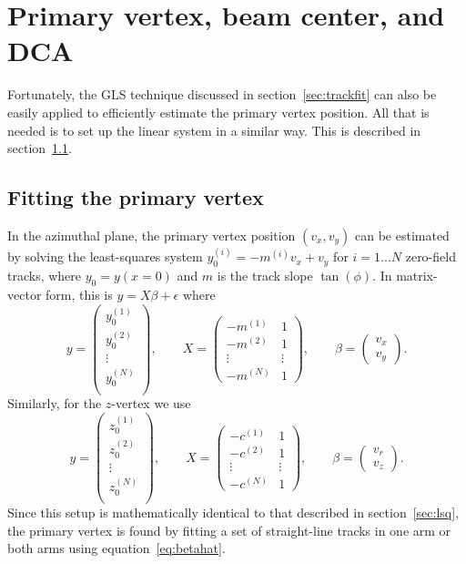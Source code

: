 \documentclass[12pt]{article}
\begin{document}
\section{Primary vertex, beam center, and DCA}
Fortunately, the GLS technique discussed in section~\ref{sec:trackfit} can also be easily applied to efficiently estimate the primary vertex position. All that is needed is to set up the linear system in a similar way. This is described in section~\ref{sec:vertex}.

\subsection{Fitting the primary vertex} \label{sec:vertex}
In the azimuthal plane, the primary vertex position $(v_x, v_y)$ can be estimated by solving the least-squares system $y_0^{(i)} = -m^{(i)}v_x + v_y$ for $i=1...N$ zero-field tracks, where $y_0 = y(x=0)$ and $m$ is the track slope $\tan(\phi)$. In matrix-vector form, this is $y = X\beta + \epsilon$ where
\begin{equation} \label{eq:vxy}
y = 
 \begin{pmatrix}
 y_0^{(1)}\\
 y_0^{(2)}\\
 \vdots \\
 y_0^{(N)}\\
 \end{pmatrix},
 \qquad
X =
 \begin{pmatrix}
  -m^{(1)}  & 1\\
  -m^{(2)}  & 1\\
  \vdots  & \vdots \\
  -m^{(N)}  & 1
 \end{pmatrix},
 \qquad
\beta = 
 \begin{pmatrix}
 v_x\\
 v_y
 \end{pmatrix}.
\end{equation}
Similarly, for the $z$-vertex we use
\begin{equation} \label{eq:vrz}
y = 
 \begin{pmatrix}
 z_0^{(1)}\\
 z_0^{(2)}\\
 \vdots \\
 z_0^{(N)}\\
 \end{pmatrix},
 \qquad
X =
 \begin{pmatrix}
  -c^{(1)}  & 1\\
  -c^{(2)}  & 1\\
  \vdots  & \vdots \\
  -c^{(N)}  & 1
 \end{pmatrix},
 \qquad
\beta = 
 \begin{pmatrix}
 v_r\\
 v_z
 \end{pmatrix}.
\end{equation}
Since this setup is mathematically identical to that described in section~\ref{sec:lsq}, the primary vertex is found by fitting a set of straight-line tracks in one arm or both arms using equation~\ref{eq:betahat}.
\end{document}
